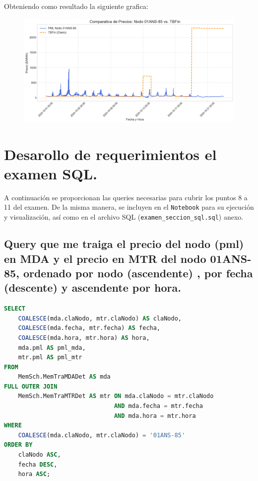 \documentclass[11pt, a4paper]{article}
\begin{document}
Obteniendo como resultado la siguiente grafica:
\begin{figure}[h!]
  \centering
  \includegraphics[width=\textwidth,keepaspectratio]{3_comp_precios.png}
\end{figure}

\newpage
\section{Desarollo de requerimientos el examen SQL.}

A continuación se proporcionan las queries necesarias para cubrir los puntos 8 a 11 del examen. De la misma manera, se incluyen en el \texttt{Notebook} para su ejecución y visualización, así como en el archivo SQL (\texttt{examen\_seccion\_sql.sql}) anexo.

\subsection{Query que me traiga el precio del nodo (pml) en MDA y el precio en MTR del nodo 01ANS-85, ordenado por nodo (ascendente) , por fecha (descente) y ascendente por hora.}

\begin{lstlisting}[language=SQL]
SELECT
    COALESCE(mda.claNodo, mtr.claNodo) AS claNodo,
    COALESCE(mda.fecha, mtr.fecha) AS fecha,
    COALESCE(mda.hora, mtr.hora) AS hora,
    mda.pml AS pml_mda,
    mtr.pml AS pml_mtr
FROM
    MemSch.MemTraMDADet AS mda
FULL OUTER JOIN
    MemSch.MemTraMTRDet AS mtr ON mda.claNodo = mtr.claNodo
                               AND mda.fecha = mtr.fecha
                               AND mda.hora = mtr.hora
WHERE
    COALESCE(mda.claNodo, mtr.claNodo) = '01ANS-85'
ORDER BY
    claNodo ASC,
    fecha DESC,
    hora ASC;
\end{lstlisting}
\end{document}
